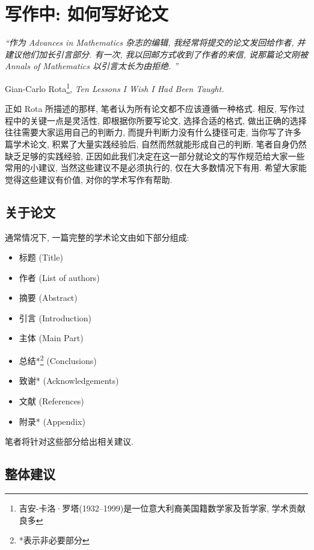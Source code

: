 \documentclass{formatBook}
\begin{document}
\section{写作中: 如何写好论文}
\noindent \textit{“作为 Advances in Mathematics 杂志的编辑, 我经常将提交的论文发回给作者, 并建议他们加长引言部分. 有一次, 我以回邮方式收到了作者的来信, 说那篇论文刚被 Annals of Mathematics 以引言太长为由拒绝. ”}
\begin{flushright}
    \cndash Gian-Carlo Rota\footnote{吉安-卡洛·罗塔(1932–1999)是一位意大利裔美国籍数学家及哲学家, 学术贡献良多}, \textit{Ten Lessons I Wish I Had Been Taught\cite{RotaTen1997}.}
\end{flushright}

正如 Rota 所描述的那样, 笔者认为所有论文都不应该遵循一种格式.  相反, 写作过程中的关键一点是灵活性, 即根据你所要写论文, 选择合适的格式, 做出正确的选择往往需要大家运用自己的判断力, 而提升判断力没有什么捷径可走, 当你写了许多篇学术论文, 积累了大量实践经验后, 自然而然就能形成自己的判断. 笔者自身仍然缺乏足够的实践经验, 正因如此我们决定在这一部分就论文的写作规范给大家一些常用的小建议, 当然这些建议不是必须执行的, 仅在大多数情况下有用. 希望大家能觉得这些建议有价值, 对你的学术写作有帮助. 
\subsection{关于论文}
通常情况下, 一篇完整的学术论文由如下部分组成: 
\begin{itemize}
    \item 标题 (Title)
    \item 作者 (List of authors)
    \item 摘要 (Abstract)
    \item 引言 (Introduction)
    \item 主体 (Main Part)
    \item 总结*\footnote{*表示非必要部分} (Conclusions)
    \item 致谢* (Acknowledgements)
    \item 文献 (References)
    \item 附录* (Appendix)
\end{itemize}
\par
笔者将针对这些部分给出相关建议. 
\subsection{整体建议}
\end{document}
